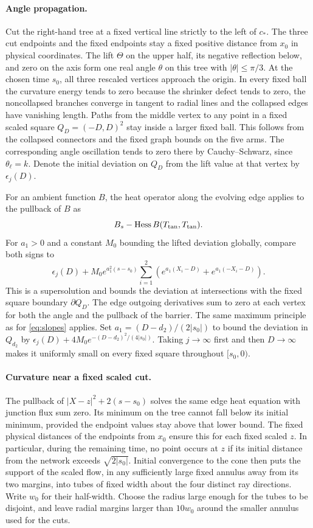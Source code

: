 \paragraph{Angle propagation.}
Cut the right-hand tree at a fixed vertical line strictly to the left
of \(c_*\). The three cut endpoints and the fixed endpoints stay
a fixed positive distance from \(x_0\) in physical coordinates.
The lift \(\Theta\) on the upper half, its negative reflection below,
and zero on the axis form one real angle \(\theta\) on this tree
with \(|\theta|\le\pi/3\). At the chosen time \(s_0\), all three
rescaled vertices approach the origin. In every fixed ball the
curvature energy tends to zero because the shrinker defect tends to zero,
the noncollapsed branches converge in tangent to radial lines and
the collapsed edges have vanishing length. Paths from the middle
vertex to any point in a fixed scaled square \(Q_D=(-D,D)^2\) stay
inside a larger fixed ball. This follows from the collapsed
connectors and the fixed graph bounds on the five arms.
The corresponding angle oscillation tends to zero there by
Cauchy--Schwarz, since \(\theta_\ell=k\). Denote the initial
deviation on \(Q_D\) from the lift value at that vertex by
\(\epsilon_j(D)\).

For an ambient function \(B\), the heat operator along the evolving edge
applies to the pullback of \(B\) as
\[
 B_s-\operatorname{Hess}B(T_{\rm tan},T_{\rm tan}).
\]
For \(a_1>0\) and a constant \(M_0\) bounding the lifted deviation
globally, compare both signs to
\[
 \epsilon_j(D)+M_0 e^{a_1^2(s-s_0)}
 \sum_{i=1}^2\left(e^{a_1(X_i-D)}+e^{a_1(-X_i-D)}\right).
\]
This is a supersolution and bounds the deviation at intersections
with the fixed square boundary \(\partial Q_D\). The edge outgoing derivatives sum to zero
at each vertex for both the angle and the pullback of the barrier.
The same maximum principle as for \eqref{eq:slopes} applies.
Set \(a_1=(D-d_2)/(2|s_0|)\) to bound the deviation in \(Q_{d_2}\)
by \(\epsilon_j(D)+4M_0 e^{-(D-d_2)^2/(4|s_0|)}\).
Taking \(j\to\infty\) first and then \(D\to\infty\) makes it
uniformly small on every fixed square throughout
\([s_0,0)\).

\paragraph{Curvature near a fixed scaled cut.}
The pullback of \(|X-z|^2+2(s-s_0)\) solves the same
edge heat equation with junction flux sum zero. Its minimum on the
tree cannot fall below its initial minimum, provided the endpoint
values stay above that lower bound. The fixed physical distances of
the endpoints from \(x_0\) ensure this for each fixed scaled \(z\).
In particular, during the remaining time, no point occurs at \(z\)
if its initial distance from the network exceeds
\(\sqrt{2|s_0|}\). Initial convergence to the cone then puts
the support of the scaled flow, in any sufficiently large fixed
annulus away from its two margins, into tubes of fixed width about
the four distinct ray directions. Write \(w_0\) for their half-width.
Choose the radius large enough for the tubes to be disjoint, and
leave radial margins larger than \(10w_0\) around the smaller
annulus used for the cuts.

